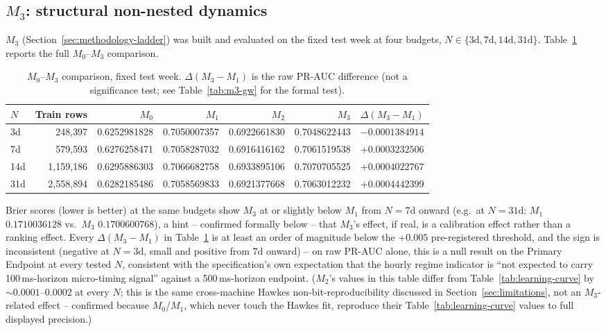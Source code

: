 \subsection{$M_3$: structural non-nested dynamics}
\label{sec:results-m3}

$M_3$ (Section~\ref{sec:methodology-ladder}) was built and evaluated on
the fixed test week at four budgets, $N \in \{3\text{d}, 7\text{d},
14\text{d}, 31\text{d}\}$. Table~\ref{tab:m3-comparison} reports the full
$M_0$--$M_3$ comparison.

\begin{table}[htbp]
\centering
\caption{$M_0$--$M_3$ comparison, fixed test week. $\Delta(M_3 - M_1)$ is
the raw PR-AUC difference (not a significance test; see
Table~\ref{tab:m3-gw} for the formal test).}
\label{tab:m3-comparison}
\begin{tabular}{@{}lrrrrrr@{}}
\toprule
$N$ & Train rows & $M_0$ & $M_1$ & $M_2$ & $M_3$ & $\Delta(M_3 - M_1)$ \\
\midrule
3d  & 248{,}397     & 0.6252981828 & 0.7050007357 & 0.6922661830 & 0.7048622443 & $-0.0001384914$ \\
7d  & 579{,}593     & 0.6276258471 & 0.7058287032 & 0.6916416162 & 0.7061519538 & $+0.0003232506$ \\
14d & 1{,}159{,}186 & 0.6295886303 & 0.7066682758 & 0.6933895106 & 0.7070705525 & $+0.0004022767$ \\
31d & 2{,}558{,}894 & 0.6282185486 & 0.7058569833 & 0.6921377668 & 0.7063012232 & $+0.0004442399$ \\
\bottomrule
\end{tabular}
\end{table}

\noindent
Brier scores (lower is better) at the same budgets show $M_3$ at or
slightly below $M_1$ from $N=7$d onward (e.g.\ at $N=31$d: $M_1$
$0.1710036128$ vs.\ $M_3$ $0.1700600768$), a hint -- confirmed formally
below -- that $M_3$'s effect, if real, is a calibration effect rather than
a ranking effect. Every $\Delta(M_3-M_1)$ in Table~\ref{tab:m3-comparison}
is at least an order of magnitude below the $+0.005$ pre-registered
threshold, and the sign is inconsistent (negative at $N=3$d, small and
positive from $7$d onward) -- on raw PR-AUC alone, this is a null result
on the Primary Endpoint at every tested $N$, consistent with the
specification's own expectation that the hourly regime indicator is
``not expected to carry 100\,ms-horizon micro-timing signal'' against a
500\,ms-horizon endpoint. ($M_2$'s values in this table differ from
Table~\ref{tab:learning-curve} by $\sim 0.0001$--$0.0002$ at every $N$; this
is the same cross-machine Hawkes non-bit-reproducibility discussed in
Section~\ref{sec:limitations}, not an $M_3$-related effect -- confirmed
because $M_0$/$M_1$, which never touch the Hawkes fit, reproduce their
Table~\ref{tab:learning-curve} values to full displayed precision.)

